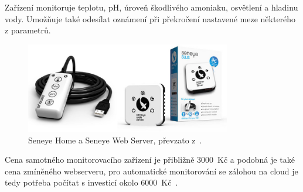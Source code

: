             Zařízení monitoruje teplotu, pH, úroveň škodlivého amoniaku, osvětlení a hladinu vody. Umožňuje také odesílat oznámení při překročení nastavené meze některého z parametrů.

            \begin{figure}[h!]
                \centering
                \includegraphics[width=0.8\textwidth]{obrazky/trh/seneye-home.jpg}
                \caption{Seneye Home a Seneye Web Server, převzato z~\cite{seneye-home}.}
                \label{fig:obrazky-trh-seneye-home-jpg}
            \end{figure}

            Cena samotného monitorovacího zařízení je přibližně \qty{3000}{Kč} a podobná je také cena zmíněného webserveru, pro automatické monitorování se zálohou na cloud je tedy potřeba počítat s investicí okolo \qty{6000}{Kč}~\cite{seneye-home}.
            


        